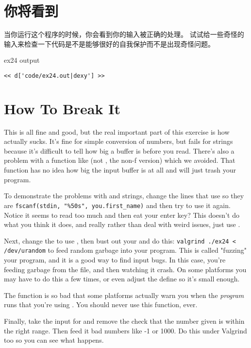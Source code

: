 \section{你将看到}

当你运行这个程序的时候，你会看到你的输入被正确的处理。
试试给一些奇怪的输入来检查一下代码是不是能够很好的自我保护而不是出现奇怪问题。

\begin{code}{ex24 output}
\begin{lstlisting}
<< d['code/ex24.out|dexy'] >>
\end{lstlisting}
\end{code}


\section{How To Break It}

This is all fine and good, but the real important part of this exercise is
how  actually sucks.  It's fine for simple conversion of numbers,
but fails for strings because it's difficult to tell  how big a buffer
is before you read.  There's also a problem with a function like 
(not , the non-f version) which we avoided.  That function has
no idea how big the input buffer is at all and will just trash your program.

To demonstrate the problems with  and strings, change the lines
that use  so they are \verb|fscanf(stdin, "%50s", you.first_name)|
and then try to use it again.  Notice it seems to read too much and then 
eat your enter key?  This doesn't do what you think it does, and really
rather than deal with weird  issues, just use .

Next, change the  to use , then bust out your
 and do this:  \verb|valgrind ./ex24 < /dev/urandom|
to feed random garbage into your program.  This is called "fuzzing"
your program, and it is a good way to find input bugs.  In this case,
you're feeding garbage from the  file, and then watching
it crash.  On some platforms you may have to do this a few times, or even
adjust the  define so it's small enough.

The  function is so bad that some platforms actually warn you
when the \emph{program} runs that you're using .  You should
never use this function, ever.

Finally, take the input for  and remove the check that the
number given is within the right range.  Then feed it bad numbers like -1 or
1000.  Do this under Valgrind too so you can see what happens.

